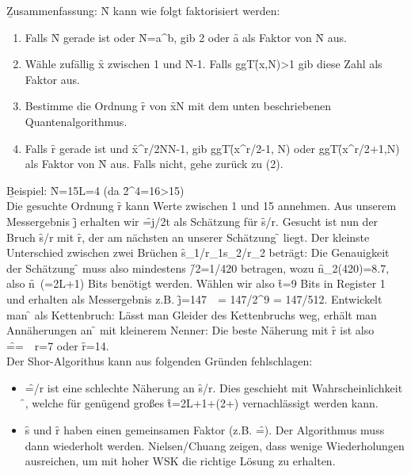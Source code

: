 \b{Zusammenfassung:} \f{N} kann wie folgt faktorisiert werden:
\begin{enumerate}
    \item Falls \f{N} gerade ist oder \f{N=a^b}, gib 2 oder \f{a} als Faktor von \f{N} aus.
    \item Wähle zufällig \f{x} zwischen 1 und \f{N-1}. Falls ggT\f{(x,N)>1} gib diese Zahl als Faktor aus.
    \item Bestimme die Ordnung \f{r} von \f{x\mod N} mit dem unten beschriebenen Quantenalgorithmus.
    \item Falls \f{r} gerade ist und \f{x^{r/2}\mod N\neq N-1}, gib ggT\f{(x^{r/2}-1, N)} oder ggT\f{(x^{r/2}+1,N)} als Faktor von \f{N} aus. Falls nicht, gehe zurück zu (2).
\end{enumerate}

\b{Beispiel:} \f{N=15\Rightarrow L=4} (da \f{2^4=16>15})\\
Die gesuchte Ordnung \f{r} kann Werte zwischen 1 und 15 annehmen. Aus unserem Messergebnis \f{j} erhalten wir \f{\varphi=j/2t} als Schätzung für \f{s/r}. Gesucht ist nun der Bruch \f{s/r} mit \f{r}, der am nächsten an unserer Schätzung \f{\varphi} liegt. Der kleinste Unterschied zwischen zwei Brüchen \f{s_1/r_1\neq s_2/r_2} beträgt:
Die Genauigkeit der Schätzung \f{\varphi} muss also mindestens \f{\Delta/2=1/420} betragen, wozu \f{n\geq\log_2(420)=8.7}, also \f{n\ (=2L+1)} Bits benötigt werden. Wählen wir also \f{t=9} Bits in Register 1 und erhalten als Messergebnis z.B. \f{j=147\ \Rightarrow\ \varphi = 147/2^9 = 147/512}. Entwickelt man \f{\varphi} als Kettenbruch:
Lässt man Gleider des Kettenbruchs weg, erhält man Annäherungen an \f{\varphi} mit kleinerem Nenner:
Die beste Näherung mit \f{r} ist also \f{==\ \Rightarrow\ r=7} oder \f{r=14}.\\

Der Shor-Algorithus kann aus folgenden Gründen fehlschlagen:
\begin{itemize}
    \item \f{\varphi=/r} ist eine schlechte Näherung an \f{s/r}. Dies geschieht mit Wahrscheinlichkeit \f{\leq\epsilon}, welche für genügend großes \f{t=2L+1+\log(2+)} vernachlässigt werden kann.
    \item \f{s} und \f{r} haben einen gemeinsamen Faktor (z.B. \f{=}). Der Algorithmus muss dann wiederholt werden. Nielsen/Chuang zeigen, dass wenige Wiederholungen ausreichen, um mit hoher WSK die richtige Lösung zu erhalten.
\end{itemize}

